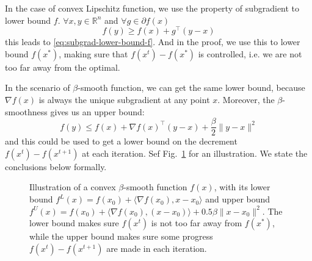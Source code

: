 \documentclass{scrartcl}
\newcommand{\RR}{\mathbb{R}}
\begin{document}
In the case of convex Lipschitz function, we use the property of subgradient to lower bound $f$.
$\forall x,y\in\RR^n$ and $\forall g\in\partial f(x)$
\[
  f(y) \geq f(x) + g^\top (y-x)
\]
this leads to \eqref{eq:subgrad-lower-bound-f}. And in the proof, we use this to lower bound $f
(x^*)$, making sure that $f(x^t)-f(x^*)$ is controlled, i.e. we are not too far away from the
optimal.

In the scenario of $\beta$-smooth function, we can get the same lower bound, because $\nabla f(x)$
is always the unique subgradient at any point $x$. Moreover, the $\beta$-smoothness gives us an
upper bound:
\[
  f(y) \leq f(x) + \nabla f(x)^\top (y-x) + \frac{\beta}{2}\|y-x\|^2
\]
and this could be used to get a lower bound on the decrement $f(x^t)-f(x^{t+1})$ at each iteration.
Sef Fig.~\ref{fig:lower-and-upper-bnd-smooth-cvx} for an illustration. We state the conclusions
below formally.

\begin{figure}
  \caption{Illustration of a convex $\beta$-smooth function $f(x)$, with its lower bound $f^L(x)=f
  (x_0)+\langle \nabla f(x_0),x-x_0\rangle$ and upper bound $f^U(x)=f(x_0)+\langle \nabla f(x_0),
  (x-x_0)\rangle + 0.5\beta\|x-x_0\|^2$. The lower bound makes sure $f (x^t)$ is not too far away
  from $f (x^*)$, while
  the upper bound makes sure some progress $f(x^t)-f(x^{t+1})$ are made in each iteration.}
  \label{fig:lower-and-upper-bnd-smooth-cvx}
\end{figure}
\end{document}
